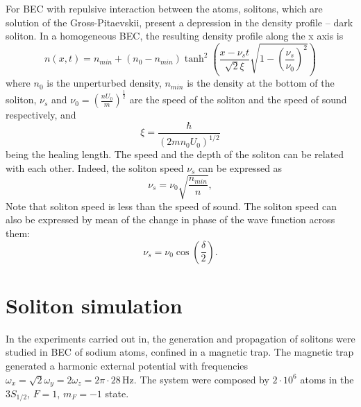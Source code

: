 For BEC with repulsive interaction between the atoms, solitons, which are solution of the Gross-Pitaevskii, present a depression in the density profile -- dark soliton. In a homogeneous BEC, the resulting density profile along the x axis is
\begin{equation}
n(x,t) = n_{min} + \left(n_0 - n_{min}\right)\tanh^2 \left( \frac{x - \nu_s t}{\sqrt{2} \xi} \sqrt{1 - \left( \frac{\nu_s}{\nu_0} \right)^2 } \right)
\end{equation}
where $n_0$ is the unperturbed density, $n_{min}$ is the density at the bottom of the soliton, $\nu_s$ and  $\nu_0 = (\frac{nU_0}{m})^{\frac{1}{2}}$ are the speed of the soliton and the speed of sound respectively, and 
\begin{equation}
\xi = \frac{\hbar}{\left( 2mn_0 U_0 \right)^{1/2}}
\end{equation}
being the healing length.
The speed and the depth of the soliton can be related with each other. Indeed, the soliton speed $\nu_s$ can be expressed as
\begin{equation}
\nu_s = \nu_0 \sqrt{ \frac{n_{min}}{n} },
\end{equation}
 Note that soliton speed is less than the speed of sound.
The soliton speed can also be expressed by mean of the change in phase of the wave function across them:
\begin{equation}
\nu_s = \nu_0 \cos \left( \frac{\delta}{2} \right).
\end{equation}

\section{Soliton simulation}
In the experiments carried out in, %
the generation and propagation of solitons were studied in BEC of sodium atoms, confined in a magnetic trap. The magnetic trap generated a harmonic external potential with frequencies $\omega_x = \sqrt{2}\omega_y = 2 \omega_z = 2 \pi \cdot 28\,$Hz. The system were composed by $2 \cdot 10^6$ atoms in the $3S_{1/2}$, $F=1$, $m_F=-1$ state. 

